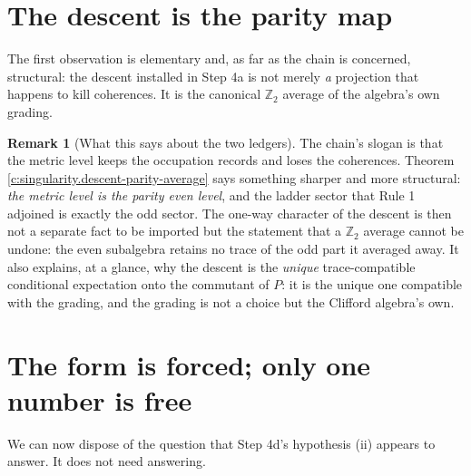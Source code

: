 \documentclass[11pt]{article}
\theoremstyle{definition}
\newtheorem{remark}[theorem]{Remark}
\theoremstyle{plain}
\begin{document}
\section{The descent is the parity map}

\label{c:note.state-selection.setting-descent-parity-map}
The first observation is elementary and, as far as the chain is concerned, structural: the descent installed in Step 4a is not merely \emph{a} projection that happens to kill coherences. It is the canonical $\mathbb{Z}_2$ average of the algebra's own grading.

\begin{remark}[What this says about the two ledgers]\label{c:note.state-selection.what-says-about-two-ledgers}
The chain's slogan is that the metric level keeps the occupation records and loses the coherences. Theorem \ref{c:singularity.descent-parity-average} says something sharper and more structural: \emph{the metric level is the parity even level}, and the ladder sector that Rule 1 adjoined is exactly the odd sector. The one-way character of the descent \cite[Fact 5.9]{ButlerT5} is then not a separate fact to be imported but the statement that a $\mathbb{Z}_2$ average cannot be undone: the even subalgebra retains no trace of the odd part it averaged away. It also explains, at a glance, why the descent is the \emph{unique} trace-compatible conditional expectation onto the commutant of $P$: it is the unique one compatible with the grading, and the grading is not a choice but the Clifford algebra's own.
\end{remark}

\section{The form is forced; only one number is free}

\label{c:note.state-selection.setting-form-forced-only-one-number}
We can now dispose of the question that Step 4d's hypothesis (ii) appears to answer. It does not need answering.
\end{document}

